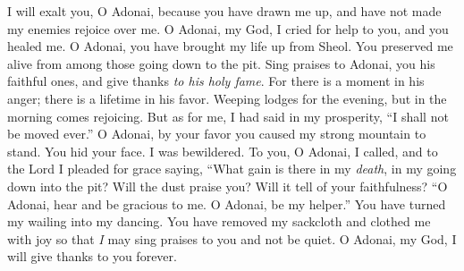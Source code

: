 \begin{biblechapter} %
 I will exalt you, O Adonai, 
because you have drawn me up, 
and have not made my enemies rejoice over me.
\verse O Adonai, my God, 
I cried for help to you, 
and you healed me.
\verse O Adonai, you have brought my life up from Sheol. 
You preserved me alive 
from among those going down  to the pit.
\verse Sing praises to Adonai, you his faithful ones, 
and give thanks \textit{to his holy fame}.
\verse For there is a moment in his anger; 
there is a lifetime in his favor. 
Weeping lodges for the evening, 
but in the morning comes rejoicing.
\verse But as for me, I had said in my prosperity, 
“I shall not be moved ever.”
\verse O Adonai, by your favor 
you caused my strong mountain to stand. 
You hid your face. I was bewildered.
\verse To you, O Adonai, I called, 
and to the Lord I pleaded for grace saying,
\verse “What gain is there in my \textit{death}, 
in my going down into the pit? 
Will the dust praise you? 
Will it tell of your faithfulness?
\verse “O Adonai, hear and be gracious to me. 
O Adonai, be my helper.”
\verse You have turned my wailing into my dancing. 
You have removed my sackcloth 
and clothed me with joy
\verse so that \textit{I} may sing praises to you 
and not be quiet. 
O Adonai, my God, 
I will give thanks to you forever.
\end{biblechapter}

